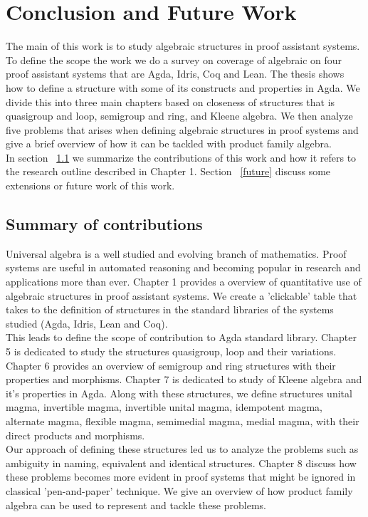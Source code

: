 \chapter{Conclusion and Future Work}
The main of this work is to study algebraic structures in proof assistant
systems. To define the scope the work we do a survey on coverage of algebraic on
four proof assistant systems that are Agda, Idris, Coq and Lean. The thesis
shows how to define a structure with some of its constructs and properties in
Agda. We divide this into three main chapters based on closeness of structures
that is quasigroup and loop, semigroup and ring, and Kleene algebra. We then
analyze five problems that arises when defining algebraic structures in proof
systems and give a brief overview of how it can be tackled with product family
algebra. \\

In section ~\ref{contribution} we summarize the contributions of this work and
how it refers to the research outline described in Chapter 1. Section
~\ref{future} discuss some extensions or future work of this work. 

\section{Summary of contributions}
\label{contribution}
Universal algebra is a well studied and evolving branch of mathematics. Proof
systems are useful in automated reasoning and becoming popular in research and
applications more than ever. Chapter 1 provides a overview of quantitative use
of algebraic structures in proof assistant systems. We create a 'clickable'
table that takes to the definition of structures in the standard libraries of
the systems studied (Agda, Idris, Lean and Coq). \\

This leads to define the scope of contribution to Agda standard library. Chapter
5 is dedicated to study the structures quasigroup, loop and their variations.
Chapter 6 provides an overview of semigroup and ring structures with their
properties and morphisms. Chapter 7 is dedicated to study of Kleene algebra and
it's properties in Agda. Along with these structures, we define structures
unital magma, invertible magma, invertible unital magma, idempotent magma,
alternate magma, flexible magma, semimedial magma, medial magma, with their
direct products and morphisms.\\

Our approach of defining these structures led us to analyze the problems such as
ambiguity in naming, equivalent and identical structures. Chapter 8 discuss how
these problems becomes more evident in proof systems that might be ignored in
classical 'pen-and-paper' technique. We give an overview of how product family
algebra can be used to represent and tackle these problems.

